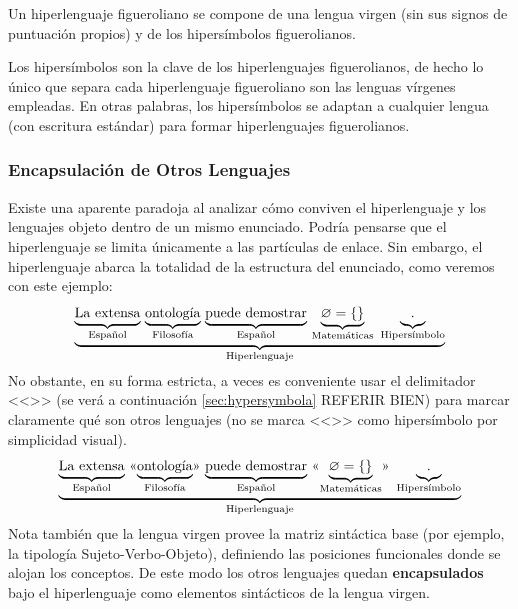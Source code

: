 \documentclass[12pt]{report}
\begin{document}
	\begin{minidefin}
		Un hiperlenguaje figueroliano se compone de una lengua virgen (sin sus signos de puntuación propios) y de los hipersímbolos figuerolianos.
	\end{minidefin}
	
	Los hipersímbolos son la clave de los hiperlenguajes figuerolianos, de hecho lo único que separa cada hiperlenguaje figueroliano son las lenguas vírgenes empleadas. En otras palabras, los hipersímbolos se adaptan a cualquier lengua (con escritura estándar) para formar hiperlenguajes figuerolianos.
	
	\subsubsection{Encapsulación de Otros Lenguajes}
	Existe una aparente paradoja al analizar cómo conviven el hiperlenguaje y los lenguajes objeto dentro de un mismo enunciado. Podría pensarse que el hiperlenguaje se limita únicamente a las partículas de enlace. Sin embargo, el hiperlenguaje abarca la totalidad de la estructura del enunciado, como veremos con este ejemplo:
	\[
	\underset{\text{Hiperlenguaje}}{\underbrace{\underset{\text{Español}}{\underbrace{\vphantom{\text{Lg}}\text{La extensa}}}\text{ }\underset{\text{Filosofía}}{\underbrace{\vphantom{\text{Lg}}\text{ontología}}}\text{ }\underset{\text{Español}}{\underbrace{\vphantom{\text{Lg}}\text{puede demostrar}}}\text{ }\underset{\text{Matemáticas}}{\underbrace{\vphantom{\text{Lg}}\varnothing = \{\}}}\,\,\,\underset{\text{Hipersímbolo}}{\underbrace{\vphantom{\text{Lg}}\text{.}}}}}
	\]
	No obstante, en su forma estricta, a veces es conveniente usar el delimitador <<>> (se verá a continuación \ref{sec:hypersymbola} REFERIR BIEN) para marcar claramente qué son otros lenguajes (no se marca <<>> como hipersímbolo por simplicidad visual).
	\[
	\underset{\text{Hiperlenguaje}}{\underbrace{\underset{\text{Español}}{\underbrace{\vphantom{\text{Lg}}\text{La extensa}}}\text{ }\text{<<}\underset{\text{Filosofía}}{\underbrace{\vphantom{\text{Lg}}\text{ontología}}}\text{>>}\text{ }\underset{\text{Español}}{\underbrace{\vphantom{\text{Lg}}\text{puede demostrar}}}\text{ }\text{<<}\underset{\text{Matemáticas}}{\underbrace{\vphantom{\text{Lg}}\varnothing = \{\}}}\text{>>}\,\,\,\underset{\text{Hipersímbolo}}{\underbrace{\vphantom{\text{Lg}}\text{.}}}}}
	\]
	Nota también que la lengua virgen provee la matriz sintáctica base (por ejemplo, la tipología Sujeto-Verbo-Objeto), definiendo las posiciones funcionales donde se alojan los conceptos. De este modo los otros lenguajes quedan \textbf{encapsulados} bajo el hiperlenguaje como elementos sintácticos de la lengua virgen.
\end{document}
